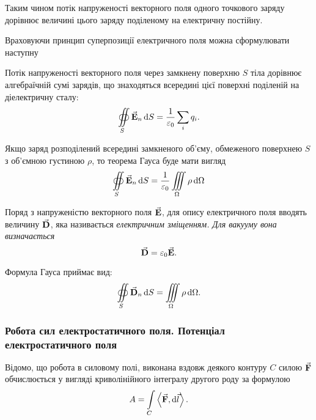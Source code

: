 Таким чином потік напруженості векторного поля одного точкового заряду дорівнює величині цього заряду поділеному на електричну постійну. \medskip

Враховуючи принцип суперпозиції електричного поля можна сформулювати наступну
\begin{theorem}
	Потік напруженості векторного поля через замкнену поверхню $S$ тіла дорівнює алгебраїчній сумі зарядів, що знаходяться всередині цієї поверхні поділеній на діелектричну сталу:
	\begin{equation}
		\displaystyle\oiint\limits_S {\vec{\mathbf{E}}}_n \mathop{}\!\mathrm{d} S = \frac{1}{\varepsilon_0} \displaystyle\sum\limits_i q_i.
	\end{equation}
\end{theorem}

Якщо заряд розподілений всередині замкненого об'єму, обмеженого поверхнею $S$ з об'ємною густиною $\rho$, то теорема Гауса буде мати вигляд
\begin{equation}
	\displaystyle\oiint\limits_S {\vec{\mathbf{E}}}_n \mathop{}\!\mathrm{d} S = \frac{1}{\varepsilon_0} \displaystyle\iiint\limits_\Omega \rho \mathop{}\!\mathrm{d} \Omega
\end{equation}

\begin{definition}
	Поряд з напруженістю векторного поля ${\vec{\mathbf{E}}}$, для опису електричного поля вводять величину ${\vec{\mathbf{D}}}$, яка називається \it{електричним зміщенням}. Для вакууму вона визначається
	\begin{equation}
		{\vec{\mathbf{D}}} = \varepsilon_0 {\vec{\mathbf{E}}}.
	\end{equation}
\end{definition}

Формула Гауса приймає вид:
\begin{equation}
	\displaystyle\oiint\limits_S {\vec{\mathbf{D}}}_n \mathop{}\!\mathrm{d} S = \displaystyle\iiint\limits_\Omega \rho \mathop{}\!\mathrm{d} \Omega.
\end{equation}

\subsubsection{Робота сил електростатичного поля. Потенціал електростатичного поля}

Відомо, що робота в силовому полі, виконана вздовж деякого контуру $C$ силою ${\vec{\mathbf{F}}}$ обчислюється у вигляді криволінійного інтегралу другого роду за формулою
\begin{equation}
	A = \Int_C \langle \vecf F, \diff \vec l\rangle.
\end{equation}

